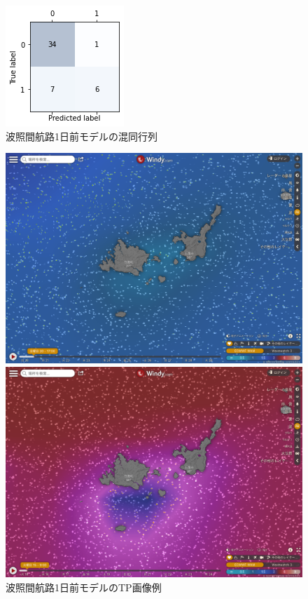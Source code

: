 \begin{figure}[H]
 \centering
 \includegraphics[keepaspectratio, scale=0.8]{fig/chapter4/wave_hateruma_1/hateruma_1_conf.png}
 \caption{波照間航路1日前モデルの混同行列}
 \label{hateruma_1_conf}
\end{figure}

\newpage

\begin{figure}[htbp]
 \begin{minipage}{0.5\hsize}
  \begin{center}
   \includegraphics[keepaspectratio, scale=0.16]{fig/chapter4/wave_hateruma_1/TP.png}
  \end{center}
  \caption{波照間航路1日前モデルのTP画像例}
  \label{hateruma_1_TP}
 \end{minipage}
 \begin{minipage}{0.5\hsize}
  \begin{center}
  \includegraphics[keepaspectratio, scale=0.16]{fig/chapter4/wave_hateruma_1/FN.png}

\end{center}
\end{minipage}
\end{figure}
